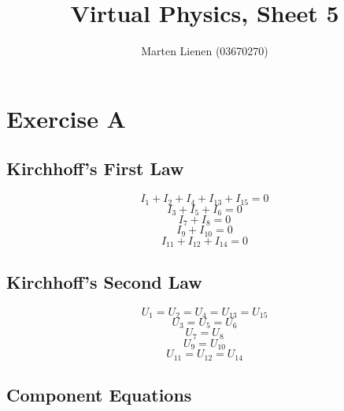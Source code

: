 \documentclass[10pt,a4paper]{article}
\title{Virtual Physics, Sheet 5}
\author{Marten Lienen (03670270)}
\begin{document}
\maketitle

\section*{Exercise A}

\subsection*{Kirchhoff's First Law}

\begin{equation*}
  I_{1} + I_{2} + I_{4} + I_{13} + I_{15} = 0
\end{equation*}
\begin{equation*}
  I_{3} + I_{5} + I_{6} = 0
\end{equation*}
\begin{equation*}
  I_{7} + I_{8} = 0
\end{equation*}
\begin{equation*}
  I_{9} + I_{10} = 0
\end{equation*}
\begin{equation*}
  I_{11} + I_{12} + I_{14} = 0
\end{equation*}

\subsection*{Kirchhoff's Second Law}

\begin{equation*}
  U_{1} = U_{2} = U_{4} = U_{13} = U_{15}
\end{equation*}
\begin{equation*}
  U_{3} = U_{5} = U_{6}
\end{equation*}
\begin{equation*}
  U_{7} = U_{8}
\end{equation*}
\begin{equation*}
  U_{9} = U_{10}
\end{equation*}
\begin{equation*}
  U_{11} = U_{12} = U_{14}
\end{equation*}

\subsection*{Component Equations}
\end{document}
